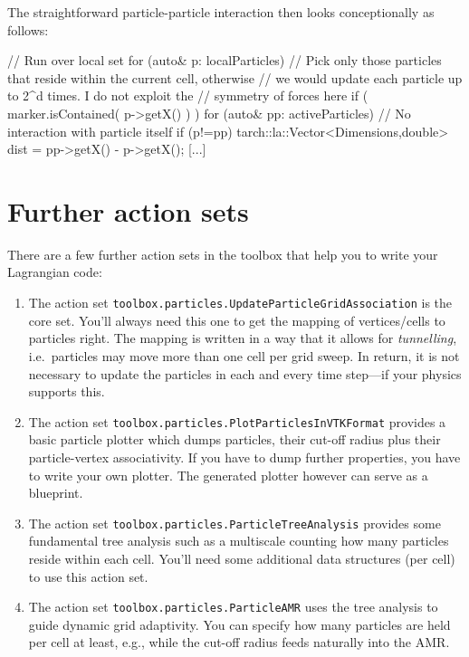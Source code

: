 The straightforward particle-particle interaction then looks conceptionally as
follows:

\begin{code}
// Run over local set
for (auto& p: localParticles) {
  // Pick only those particles that reside within the current cell, otherwise
  // we would update each particle up to 2^d times. I do not exploit the
  // symmetry of forces here
  if ( marker.isContained( p->getX() ) ) {
    for (auto& pp: activeParticles) {
      // No interaction with particle itself
      if (p!=pp) {
        tarch::la::Vector<Dimensions,double> dist = pp->getX() - p->getX();
        [...]
      }
    }
  }
}
\end{code}




\section{Further action sets}

There are a few further action sets in the toolbox that help you to write your
Lagrangian code:


\begin{enumerate}
  \item The action set \texttt{toolbox.particles.UpdateParticleGridAssociation}
  is the core set. You'll always need this one to get the mapping of
  vertices/cells to particles right. The mapping is written in a way that it
  allows for \emph{tunnelling}, i.e.~particles may move more than one cell per
  grid sweep. In return, it is not necessary to update the particles in each and
  every time step---if your physics supports this.
  \item The action set \texttt{toolbox.particles.PlotParticlesInVTKFormat}
  provides a basic particle plotter which dumps particles, their cut-off radius
  plus their particle-vertex associativity. If you have to dump further
  properties, you have to write your own plotter. The generated plotter however
  can serve as a blueprint.
  \item The action set \texttt{toolbox.particles.ParticleTreeAnalysis} provides
  some fundamental tree analysis such as a multiscale counting how many
  particles reside within each cell. You'll need some additional data structures
  (per cell) to use this action set.
  \item The action set \texttt{toolbox.particles.ParticleAMR} uses the tree
  analysis to guide dynamic grid adaptivity. You can specify how many particles
  are held per cell at least, e.g., while the cut-off radius feeds naturally
  into the AMR.
\end{enumerate}


